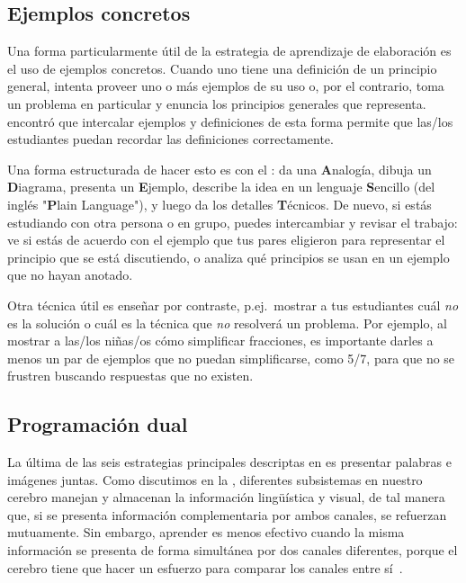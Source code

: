 \subsection*{Ejemplos concretos}

Una forma particularmente útil de la estrategia de aprendizaje de elaboración es el uso de ejemplos concretos.
Cuando uno tiene una definición de un principio general,
intenta proveer uno o más ejemplos de su uso
o, por el contrario, toma un problema en particular y enuncia los principios generales que representa.
\cite{Raws2014} encontró que intercalar ejemplos y definiciones de esta forma
permite que las/los estudiantes puedan recordar las definiciones correctamente.

Una forma estructurada de hacer esto es con
el :
da una \textbf{A}nalogía,
dibuja un \textbf{D}iagrama,
presenta un \textbf{E}jemplo,
describe la idea en un lenguaje \textbf{S}encillo (del inglés "\textbf{P}lain Language"),
y luego da los detalles \textbf{T}écnicos.
De nuevo,
si estás estudiando con otra persona o en grupo,
puedes intercambiar y revisar el trabajo:
ve si estás de acuerdo con el ejemplo que tus pares eligieron para representar
el principio que se está discutiendo,
o analiza qué principios se usan en un ejemplo que no hayan anotado.

Otra técnica útil es enseñar por contraste,
p.ej.\ mostrar a tus estudiantes cuál \emph{no} es la solución
o cuál es la técnica que \emph{no} resolverá un problema.
Por ejemplo,
al mostrar a las/los niñas/os cómo simplificar fracciones,
es importante darles a menos un par de ejemplos que no puedan simplificarse, como 5/7,
para que no se frustren buscando respuestas que no existen.

\subsection*{Programación dual}

La última de las seis estrategias principales
descriptas en 
es presentar palabras e imágenes juntas.
Como discutimos en la ,
diferentes subsistemas en nuestro cerebro manejan y almacenan la información lingüística y visual,
de tal manera que, si se presenta información complementaria por ambos canales,
se refuerzan mutuamente.
Sin embargo,
aprender es menos efectivo cuando la misma información se presenta de forma simultánea por dos canales diferentes,
porque el cerebro tiene que hacer un esfuerzo para comparar los canales entre sí~\cite{Maye2003}.

